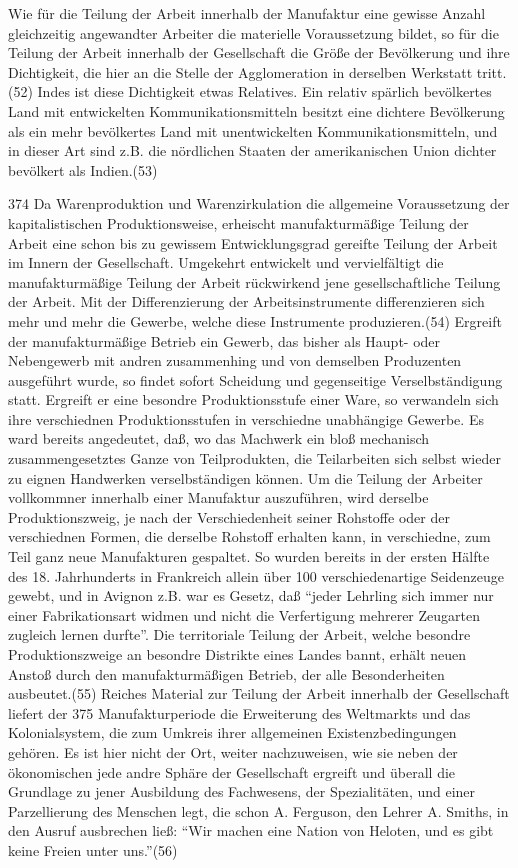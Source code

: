 {Wie für die Teilung der Arbeit innerhalb der Manufaktur eine gewisse
Anzahl gleichzeitig angewandter Arbeiter die materielle Voraussetzung
bildet, so für die Teilung der Arbeit innerhalb der Gesellschaft die
Größe der Bevölkerung und ihre Dichtigkeit, die hier an die Stelle der
Agglomeration in derselben Werkstatt tritt.(52) Indes ist diese
Dichtigkeit etwas Relatives. Ein relativ spärlich bevölkertes Land mit
entwickelten Kommunikationsmitteln besitzt eine dichtere Bevölkerung als
ein mehr bevölkertes Land mit unentwickelten Kommunikationsmitteln, und
in dieser Art sind z.B. die nördlichen Staaten der amerikanischen Union
dichter bevölkert als Indien.(53)

\num{374} Da Warenproduktion und Warenzirkulation die
allgemeine Voraussetzung der kapitalistischen Produktionsweise,
erheischt manufakturmäßige Teilung der Arbeit eine schon bis zu gewissem
Entwicklungsgrad gereifte Teilung der Arbeit im Innern der Gesellschaft.
Umgekehrt entwickelt und vervielfältigt die manufakturmäßige Teilung der
Arbeit rückwirkend jene gesellschaftliche Teilung der Arbeit. Mit der
Differenzierung der Arbeitsinstrumente differenzieren sich mehr und mehr
die Gewerbe, welche diese Instrumente produzieren.(54) Ergreift der
manufakturmäßige Betrieb ein Gewerb, das bisher als Haupt- oder
Nebengewerb mit andren zusammenhing und von demselben Produzenten
ausgeführt wurde, so findet sofort Scheidung und gegenseitige
Verselbständigung statt. Ergreift er eine besondre Produktionsstufe
einer Ware, so verwandeln sich ihre verschiednen Produktionsstufen in
verschiedne unabhängige Gewerbe. Es ward bereits angedeutet, daß, wo das
Machwerk ein bloß mechanisch zusammengesetztes Ganze von Teilprodukten,
die Teilarbeiten sich selbst wieder zu eignen Handwerken
verselbständigen können. Um die Teilung der Arbeiter vollkommner
innerhalb einer Manufaktur auszuführen, wird derselbe Produktionszweig,
je nach der Verschiedenheit seiner Rohstoffe oder der verschiednen
Formen, die derselbe Rohstoff erhalten kann, in verschiedne, zum Teil
ganz neue Manufakturen gespaltet. So wurden bereits in der ersten Hälfte
des 18. Jahrhunderts in Frankreich allein über 100 verschiedenartige
Seidenzeuge gewebt, und in Avignon z.B. war es Gesetz, daß ``jeder
Lehrling sich immer nur einer Fabrikationsart widmen und nicht die
Verfertigung mehrerer Zeugarten zugleich lernen durfte''. Die
territoriale Teilung der Arbeit, welche besondre Produktionszweige an
besondre Distrikte eines Landes bannt, erhält neuen Anstoß durch den
manufakturmäßigen Betrieb, der alle Besonderheiten ausbeutet.(55)
Reiches Material zur Teilung der Arbeit innerhalb der Gesellschaft
liefert der \num{375} Manufakturperiode die
Erweiterung des Weltmarkts und das Kolonialsystem, die zum Umkreis ihrer
allgemeinen Existenzbedingungen gehören. Es ist hier nicht der Ort,
weiter nachzuweisen, wie sie neben der ökonomischen jede andre Sphäre
der Gesellschaft ergreift und überall die Grundlage zu jener Ausbildung
des Fachwesens, der Spezialitäten, und einer Parzellierung des Menschen
legt, die schon A. Ferguson, den Lehrer A. Smiths, in den Ausruf
ausbrechen ließ: ``Wir machen eine Nation von Heloten, und es gibt keine
Freien unter uns.''(56)

}
